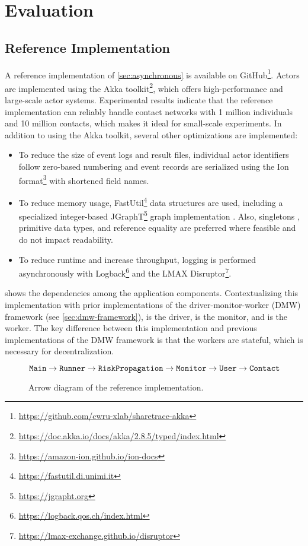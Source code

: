 \chapter{Evaluation}

\section{Reference Implementation}

A reference implementation of \cref{sec:asynchronous} is available on GitHub\footnote{\url{https://github.com/cwru-xlab/sharetrace-akka}}. Actors are implemented using the Akka toolkit\footnote{\url{https://doc.akka.io/docs/akka/2.8.5/typed/index.html}}, which offers high-performance and large-scale actor systems. Experimental results indicate that the reference implementation can reliably handle contact networks with 1 million individuals and 10 million contacts, which makes it ideal for small-scale experiments. In addition to using the Akka toolkit, several other optimizations are implemented:
\begin{itemize}
  \item To reduce the size of event logs and result files, individual actor identifiers follow zero-based numbering and event records are serialized using the Ion format\footnote{\url{https://amazon-ion.github.io/ion-docs}} with shortened field names.
  \item To reduce memory usage, FastUtil\footnote{\url{https://fastutil.di.unimi.it}} data structures are used, including a specialized integer-based JGraphT\footnote{\url{https://jgrapht.org}} graph implementation \citep{Michail2020}. Also, singletons \citep{Gamma1995}, primitive data types, and reference equality are preferred where feasible and do not impact readability.
  \item To reduce runtime and increase throughput, logging is performed asynchronously with Logback\footnote{\url{https://logback.qos.ch/index.html}} and the LMAX Disruptor\footnote{\url{https://lmax-exchange.github.io/disruptor}}.
\end{itemize}

 shows the dependencies among the application components. Contextualizing this implementation with prior implementations of the driver-monitor-worker (DMW) framework (see \cref{sec:dmw-framework}),  is the driver,  is the monitor, and  is the worker. The key difference between this implementation and previous implementations of the DMW framework is that the workers are stateful, which is necessary for decentralization.
\begin{figure}[htbp]
\begin{equation*}
  \texttt{Main} \rightarrow \texttt{Runner} \rightarrow \texttt{RiskPropagation} \rightarrow \texttt{Monitor} \rightarrow \texttt{User} \rightarrow \texttt{Contact}
\end{equation*}
\caption[Arrow diagram of the reference implementation]{Arrow diagram of the reference implementation.}
\label{fig:arrow-diagram}
\end{figure}

